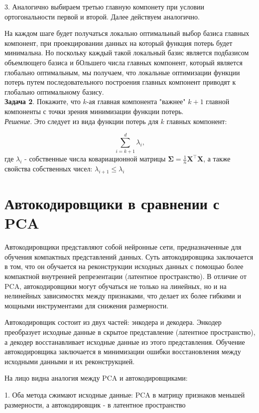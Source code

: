 3. Аналогично выбираем третью главную компонету при условии ортогональности первой и второй. Далее действуем аналогично.


На каждом шаге будет получаться локально оптимальный выбор базиса главных компонент, при проекцировании данных на который функция потерь будет минимальна. Но поскольку каждый такой локальный базис является подбазисом объемлющего базиса и бОльшего числа главных компонент, который является глобально оптимальным, мы получаем, что локальные оптимизации функции потерь путем последовательного построения главных компонент приводят к глобально оптимальному базису.\\

\textbf{Задача 2}. Покажите, что $k$-ая главная компонента "важнее"  $k+1$ главной компоненты с точки зрения минимизации функции потерь.\\

\textit{Решение}. Это следует из вида функции потерь для $k$ главных компонент:

\[
\sum_{i=k+1}^d \lambda_i,
\]
где $\lambda_i$ - собственные числа ковариационной матрицы $\mathbf{\Sigma} = \frac{1}{n} \mathbf{X}^\top \mathbf{X}$, а также свойства собственных чисел: $ \lambda_{i+1} \leq \lambda_i$

\section{Автокодировщики в сравнении с PCA}

Автокодировщики представляют собой нейронные сети, предназначенные для обучения компактных представлений данных. Суть автокодировщика заключается в том, что он обучается на реконструкции исходных данных с помощью более компактной внутренней репрезентации (латентное пространство). В отличие от PCA, автокодировщики могут обучаться не только на линейных, но и на нелинейных зависимостях между признаками, что делает их более гибкими и мощными инструментами для снижения размерности.

Автокодировщик состоит из двух частей: энкодера и декодера. Энкодер преобразует исходные данные в скрытое представление (латентное пространство), а декодер восстанавливает исходные данные из этого представления. Обучение автокодировщика заключается в минимизации ошибки восстановления между исходными данными и их реконструкцией.

На лицо видна аналогия между PCA и автокодировщиками: 

1. Оба метода сжимают исходные данные: PCA в матрицу признаков меньшей размерности, а автокодировщик - в латентное пространство

